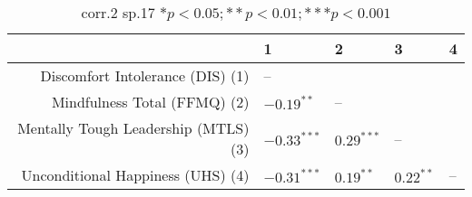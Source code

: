 \begin{table}[ht]
\centering
\begin{tabular}{rllll}
  \hline
 & 1 & 2 & 3 & 4 \\ 
  \hline
Discomfort Intolerance (DIS) (1) & -- &  &  &  \\ 
  Mindfulness Total (FFMQ) (2) & $-0.19^{**}$ & -- &  &  \\ 
  Mentally Tough Leadership (MTLS) (3) & $-0.33^{***}$ & $0.29^{***}$ & -- &  \\ 
  Unconditional Happiness (UHS) (4) & $-0.31^{***}$ & $0.19^{**}$ & $0.22^{**}$ & -- \\ 
   \hline
\end{tabular}
\caption{corr.2 sp.17 $* p < 0.05; ** p < 0.01; *** p < 0.001$} 
\label{freq_corr.corr.2.sp.17}
\end{table}
